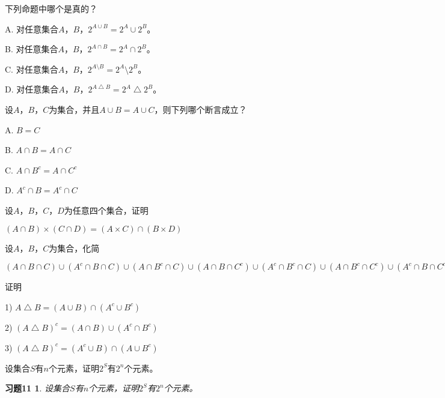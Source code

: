  \begin{Exercise}
下列命题中哪个是真的？

A. 对任意集合$A$，$B$，$2^{A\cup B} = 2^A \cup 2^B$。

B. 对任意集合$A$，$B$，$2^{A\cap B} = 2^A \cap 2^B$。

C. 对任意集合$A$，$B$，$2^{A\setminus B} = 2^A \setminus 2^B$。

D. 对任意集合$A$，$B$，$2^{A\bigtriangleup B} = 2^A \bigtriangleup 2^B$。
  \end{Exercise}
  \begin{Exercise}
    设$A$，$B$，$C$为集合，并且$A\cup B = A \cup C$，则下列哪个断言成立？

    A. $B = C$

    B. $A \cap B = A \cap C$

    C. $A \cap B^c = A \cap C^c$

    D. $A^c \cap B = A^c \cap C$
  \end{Exercise}
  \begin{Exercise}
    设$A$，$B$，$C$，$D$为任意四个集合，证明

    $(A \cap B) \times (C \cap D) =
    (A\times C) \cap (B \times D)$
  \end{Exercise}
  \begin{Exercise}
   设$A$，$B$，$C$为集合，化简

$(A \cap B \cap C)\cup (A^c \cap B \cap C) \cup (A \cap B^c \cap C) \cup (A \cap B \cap C^c) \cup (A^c \cap B^c \cap C) \cup (A \cap B^c \cap C^c) \cup (A^c \cap B \cap C^c)$
  \end{Exercise}
  \begin{Exercise}
   证明

1) $A\bigtriangleup B = (A\cup B) \cap (A^c \cup B^c)$

2) $(A \bigtriangleup B)^c = (A \cap B) \cup (A^c \cap B^c)$

3) $(A \bigtriangleup B)^c = (A^c \cup B) \cap (A \cup B^c)$
\end{Exercise}
  \begin{Exercise}
    设集合$S$有$n$个元素，证明$2^S$有$2^n$个元素。
  \end{Exercise}  

\clearpage
\newtheorem*{Exercise11}{习题11}
  \begin{Exercise11}
    设集合$S$有$n$个元素，证明$2^S$有$2^n$个元素。
  \end{Exercise11}

